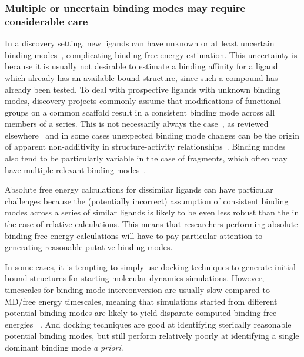 \documentclass[9pt,bestpractices]{livecoms}
\begin{document}
\subsubsection{Multiple or uncertain binding modes may require considerable care}
\label{sec:multiple_binding_modes}
In a discovery setting, new ligands can have unknown or at least uncertain binding modes~\cite{kaus2015how, plountprice2000analysis,mobley2009binding,calabro2016elucidation}, complicating binding free energy estimation.
This uncertainty is because it is usually not desirable to estimate a binding affinity for a ligand which already has an available bound structure, since such a compound has already been tested.
To deal with prospective ligands with unknown binding modes, discovery projects commonly assume that modifications of functional groups on a common scaffold result in a consistent binding mode across all members of a series.
This is not necessarily always the case~\cite{kaus2015how}, as reviewed elsewhere~\cite{mobley2009binding} and in some cases unexpected binding mode changes can be the origin of apparent non-additivity in structure-activity relationships~\cite{calabro2016elucidation}.
Binding modes also tend to be particularly variable in the case of fragments, which often may have multiple relevant binding modes~\cite{steinbrecher2015accurate}.


Absolute free energy calculations for dissimilar ligands can have particular challenges because the (potentially incorrect) assumption of consistent binding modes across a series of similar ligands is likely to be even less robust than the in the case of relative calculations.
This means that researchers performing absolute binding free energy calculations will have to pay particular attention to generating reasonable putative binding modes.

In some cases, it is tempting to simply use docking techniques to generate initial bound structures for starting molecular dynamics simulations.
However, timescales for binding mode interconversion are usually slow compared to MD/free energy timescales, meaning that simulations started from different potential binding modes are likely to yield disparate computed binding free energies~\cite{mobley2006use, palma2012computation, mobley2012perspective, gill2018binding} .
And docking techniques are good at identifying sterically reasonable potential binding modes, but still perform relatively poorly at identifying a single dominant binding mode \emph{a priori}. 
\end{document}
